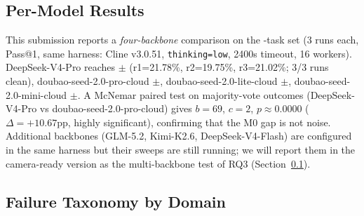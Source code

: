 \subsection{Per-Model Results}
\label{sec:per-model}

This submission reports a \emph{four-backbone} comparison on the \Ncases{}-task set (3 runs each, Pass@1, same harness: Cline v3.0.51, \texttt{thinking=low}, 2400s timeout, 16 workers). DeepSeek-V4-Pro reaches \DSvPro{}$\pm$\DSvProStd{} (r1=21.78\%, r2=19.75\%, r3=21.02\%; 3/3 runs clean), doubao-seed-2.0-pro-cloud \DoubaoPro{}$\pm$\DoubaoProStd{}, doubao-seed-2.0-lite-cloud \DoubaoLite{}$\pm$\DoubaoLiteStd{}, doubao-seed-2.0-mini-cloud \DoubaoMini{}$\pm$\DoubaoMiniStd{}. A McNemar paired test on majority-vote outcomes (DeepSeek-V4-Pro vs doubao-seed-2.0-pro-cloud) gives $b{=}69$, $c{=}2$, $p\approx 0.0000$ ($\Delta{=}{+}10.67$pp, highly significant), confirming that the M0 gap is not noise. Additional backbones (GLM-5.2, Kimi-K2.6, DeepSeek-V4-Flash) are configured in the same harness but their sweeps are still running; we will report them in the camera-ready version as the multi-backbone test of RQ3 (Section~\ref{sec:per-model}).

\subsection{Failure Taxonomy by Domain}
\label{sec:failure-by-domain}


